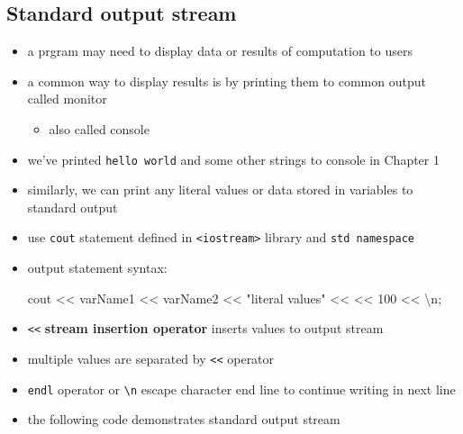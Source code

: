 \documentclass[11pt]{article}
\providecommand{\tightlist}{%
      \setlength{\itemsep}{0pt}\setlength{\parskip}{0pt}}
\newenvironment{Shaded}{}{}
\newcommand{\DecValTok}[1]{\textcolor[rgb]{0.25,0.63,0.44}{{#1}}}
\newcommand{\CharTok}[1]{\textcolor[rgb]{0.25,0.44,0.63}{{#1}}}
\newcommand{\StringTok}[1]{\textcolor[rgb]{0.25,0.44,0.63}{{#1}}}
\newcommand{\NormalTok}[1]{{#1}}
\newcommand{\SpecialCharTok}[1]{\textcolor[rgb]{0.25,0.44,0.63}{{#1}}}
\newcommand{\OperatorTok}[1]{\textcolor[rgb]{0.40,0.40,0.40}{{#1}}}
\begin{document}
    \hypertarget{standard-output-stream}{%
\subsection{Standard output stream}\label{standard-output-stream}}

\begin{itemize}
\item
  a prgram may need to display data or results of computation to users
\item
  a common way to display results is by printing them to common output
  called monitor

  \begin{itemize}
  \tightlist
  \item
    also called console
  \end{itemize}
\item
  we've printed \texttt{hello\ world} and some other strings to console
  in Chapter 1
\item
  similarly, we can print any literal values or data stored in variables
  to standard output
\item
  use \texttt{cout} statement defined in
  \texttt{\textless{}iostream\textgreater{}} library and
  \texttt{std\ namespace}
\item
  output statement syntax:

\begin{Shaded}
\begin{Highlighting}[]
\NormalTok{cout }\OperatorTok{\textless{}\textless{}}\NormalTok{ varName1 }\OperatorTok{\textless{}\textless{}}\NormalTok{ varName2 }\OperatorTok{\textless{}\textless{}} \StringTok{"literal values"} \OperatorTok{\textless{}\textless{}} \CharTok{\textquotesingle{} \textquotesingle{}} \OperatorTok{\textless{}\textless{}} \DecValTok{100} \OperatorTok{\textless{}\textless{}} \CharTok{\textquotesingle{}}\SpecialCharTok{\textbackslash{}n}\CharTok{\textquotesingle{}}\OperatorTok{;}
\end{Highlighting}
\end{Shaded}
\item
  \texttt{\textless{}\textless{}} \textbf{stream insertion operator}
  inserts values to output stream
\item
  multiple values are separated by \texttt{\textless{}\textless{}}
  operator
\item
  \texttt{endl} operator or \texttt{\textbackslash{}n} escape character
  end line to continue writing in next line
\item
  the following code demonstrates standard output stream
\end{itemize}
\end{document}
